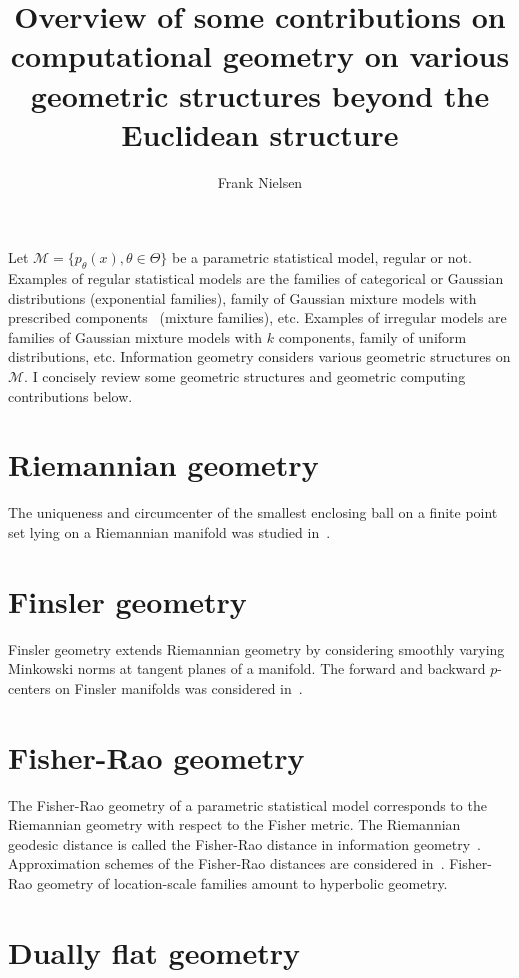 \documentclass[11pt]{article}
\title{Overview of some contributions on computational geometry on various geometric structures beyond the Euclidean structure}
\author{Frank Nielsen}
\date{}
\def\calM{\mathcal{M}}
\begin{document}
\maketitle

Let $\calM=\{p_\theta(x), \theta\in\Theta\}$ be a parametric statistical model, regular or not.
Examples of regular statistical models are the families of categorical or Gaussian distributions (exponential families), family of Gaussian mixture models with prescribed components~\cite{nielsen2018geometry} (mixture families), etc.
Examples of irregular models are families of Gaussian mixture models with $k$ components, family of uniform distributions, etc.
Information geometry considers various geometric structures on $\calM$.
I concisely review some geometric structures and geometric computing contributions below.


\section*{Riemannian geometry}

The uniqueness and circumcenter of the smallest enclosing ball on a finite point set lying on a Riemannian manifold was studied in~\cite{arnaudon2013approximating}.

\section*{Finsler geometry}

Finsler geometry extends Riemannian geometry by considering smoothly varying Minkowski norms at tangent planes of a manifold.
The forward and backward $p$-centers on Finsler manifolds was considered in~\cite{arnaudon2012medians}.


\section*{Fisher-Rao geometry}

The Fisher-Rao geometry of a parametric statistical model corresponds to the Riemannian geometry with respect to the Fisher metric.
The Riemannian geodesic distance is called the Fisher-Rao distance in information geometry~\cite{nielsen2020elementary}.
Approximation schemes of the Fisher-Rao distances are considered in~\cite{nielsen2023simple,NIELSEN2024}.
Fisher-Rao geometry of location-scale families amount to hyperbolic geometry.


\section*{Dually flat geometry}
\end{document}
